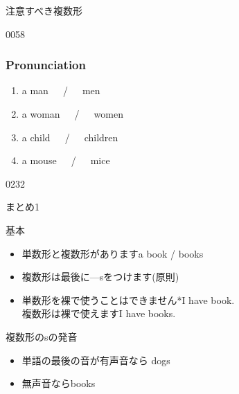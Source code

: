\documentclass[aspectratio=169,xcolor={dvipsnames,table}]{beamer}
\newcommand{\myaudio}[1]{\href{#1}{\faVolumeUp}}
\begin{document}
\begin{frame}[plain]{注意すべき複数形}
 \pause\hspace{190pt}{\LARGE a mouse}%
\pause{}


\bigskip

\bigskip

\pause{}%
\pause{}


\bigskip

\bigskip

\mbox{}\hfill{\tiny 0058}\,{\scriptsize \myaudio{./audio/005_singular_plural_11.mp3}}
\end{frame}
\begin{frame}[plain]\frametitle{Pronunciation}

\begin{enumerate}
 \item a man~~~\pause{}/~~~men\pause
 \item a woman~~~\pause{}/~~~women\pause
 \item a child~~~\pause{}/~~~children\pause
 \item a mouse~~~\pause{}/~~~mice
  \end{enumerate}
\pause

\bigskip

\bigskip

\mbox{}\hfill{\tiny 0232}\,{\scriptsize \myaudio{./audio/005_singular_plural_12.mp3}}
\end{frame}
\begin{frame}[plain]{まとめ1}
 \begin{block}{基本}\small
\begin{itemize}
 \item  単数形と複数形があります\hfill{}a book / books
 \item 複数形は最後に---sをつけます(原則)
 \item  単数形を裸で使うことはできません\hfill{}*I have book.\,\,\dbend\\
複数形は裸で使えます\hfill{}I have books.\,\phantom{\dbend}\mbox{}
\end{itemize}
      \end{block}

\pause

\begin{block}{複数形のsの発音}\small
\begin{itemize}
 \item 単語の最後の音が有声音なら\,\,\dbend\hfill{}dogs 
 \item \phantom{単語の最後の音が}無声音なら\hfill{}books 
\end{itemize}
\end{block}
\end{frame}
\end{document}
